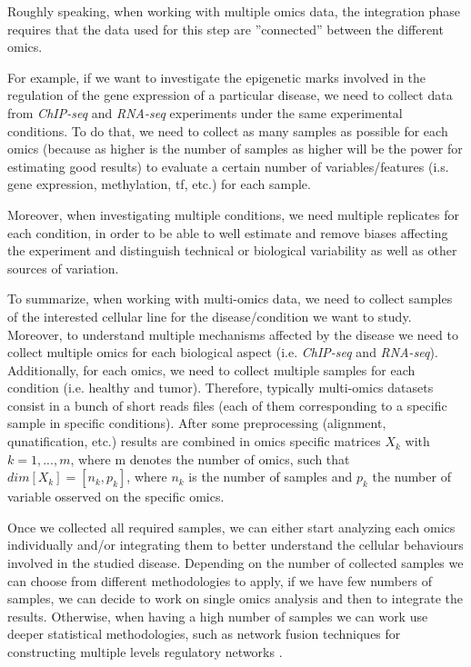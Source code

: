 Roughly speaking, when working with multiple omics data, the integration phase requires that the data used for this step are ''connected'' between the different omics.

For example, if we want to investigate the epigenetic marks involved in the regulation of the gene expression of a particular disease, we need to collect data from \textit{ChIP-seq} and \textit{RNA-seq} experiments under the same experimental conditions.
To do that, we need to collect as many samples as possible for each omics (because as higher is the number of samples as higher will be the power for estimating good results) to evaluate a certain number of variables/features (i.s. gene expression, methylation, \gls{tf}, etc.) for each sample.

Moreover, when investigating multiple conditions, we need multiple replicates for each condition, in order to be able to well estimate and remove biases affecting the experiment and distinguish technical or biological variability as well as other sources of variation.

To summarize, when working with multi-omics data, we need to collect samples of the interested cellular line for the disease/condition we want to study.
Moreover, to understand multiple mechanisms affected by the disease we need to collect multiple omics for each biological aspect (i.e. \textit{ChIP-seq} and \textit{RNA-seq}).
Additionally, for each omics, we need to collect multiple samples for each condition (i.e. healthy and tumor).
Therefore, typically multi-omics datasets consist in a bunch of short reads files (each of them corresponding to a specific sample in specific conditions). 
After some preprocessing (alignment, qunatification, etc.) results are combined in omics specific matrices $X_k$ with  $k=1,...,m$, where m denotes the number of omics, such that $dim[X_k]=[n_k, p_k]$, where $n_k$ is the number of samples and $p_k$ the number of variable osserved on the specific omics.

Once we collected all required samples, we can either start analyzing each omics individually and/or integrating them to better understand the cellular behaviours involved in the studied disease.
Depending on the number of collected samples we can choose from different methodologies to apply, if we have few numbers of samples, we can decide to work on single omics analysis and then to integrate the results.
Otherwise, when having a high number of samples we can work use deeper statistical methodologies, such as network fusion techniques for constructing multiple levels regulatory networks \cite{Angelini2014c, Rohart2017, Argelaguet2018}.

